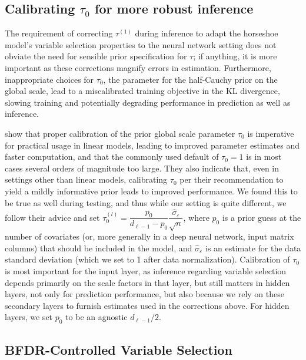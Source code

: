 \subsection{Calibrating $\tau_0$ for more robust inference}
\label{subsec:ch3-taunotes}

The requirement of correcting $\tau^{(1)}$ during inference to adapt the horseshoe model's variable selection properties to the neural network setting does not obviate the need for sensible prior specification for $\tau$; if anything, it is more important as these corrections magnify errors in estimation.  Furthermore, inappropriate choices for $\tau_0$, the parameter for the half-Cauchy prior on the global scale, lead to a miscalibrated training objective in the KL divergence, slowing training and potentially degrading performance in prediction as well as inference.

\citet{piironen_hyperprior_2017} show that proper calibration of the prior global scale parameter $\tau_0$ is imperative for practical usage in linear models, leading to improved parameter estimates and faster computation, and that the commonly used default of $\tau_0 = 1$ is in most cases several orders of magnitude too large.  They also indicate that, even in settings other than linear models, calibrating $\tau_0$ per their recommendation to yield a mildly informative prior leads to improved performance.  We found this to be true as well during testing, and thus while our setting is quite different, we follow their advice and set $\tau^{(l)}_0 = \dfrac{p_0}{d_{\ell-1} - p_0} \dfrac{\hat{\sigma}_\varepsilon}{\sqrt{n}}$, where $p_0$ is a prior guess at the number of covariates (or, more generally in a deep neural network, input matrix columns) that should be included in the model, and $\hat{\sigma}_\varepsilon$ is an estimate for the data standard deviation (which we set to 1 after data normalization).  Calibration of $\tau_0$ is most important for the input layer, as inference regarding variable selection depends primarily on the scale factors in that layer, but still matters in hidden layers, not only for prediction performance, but also because we rely on these secondary layers to furnish estimates used in the corrections above.  For hidden layers, we set $p_0$ to be an agnostic $d_{\ell-1} / 2$.



\subsection{BFDR-Controlled Variable Selection}
\label{subsec:ch3-bfdr}

